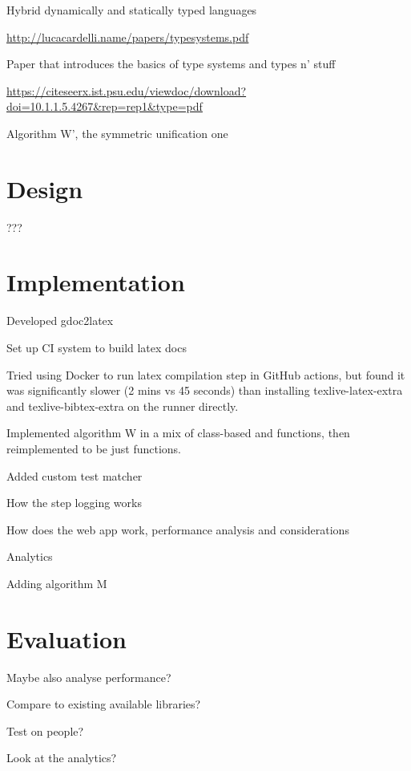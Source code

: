 \documentclass[a4paper,fleqn,12pt]{article}
\begin{document}
Hybrid dynamically and statically typed languages

\underline{\href{http://lucacardelli.name/papers/typesystems.pdf}{http://lucacardelli.name/papers/typesystems.pdf}}

Paper that introduces the basics of type systems and types n’ stuff

\underline{\href{https://citeseerx.ist.psu.edu/viewdoc/download?doi=10.1.1.5.4267\&rep=rep1\&type=pdf}{https://citeseerx.ist.psu.edu/viewdoc/download?doi=10.1.1.5.4267\&rep=rep1\&type=pdf}}

Algorithm W’, the symmetric unification one

\section{Design}\label{id:h.7ggvdxb04tzm}

???

\section{Implementation}\label{id:h.igepudpadp49}

Developed gdoc2latex

Set up CI system to build latex docs

Tried using Docker to run latex compilation step in GitHub actions, but found it was significantly slower (2 mins vs 45 seconds) than installing texlive-latex-extra and texlive-bibtex-extra on the runner directly.

Implemented algorithm W in a mix of class-based and functions, then reimplemented to be just functions.

Added custom test matcher

How the step logging works

How does the web app work, performance analysis and considerations

Analytics

Adding algorithm M

\section{Evaluation}\label{id:h.e6letww4nhn0}

Maybe also analyse performance?

Compare to existing available libraries?

Test on people?

Look at the analytics?
\end{document}
